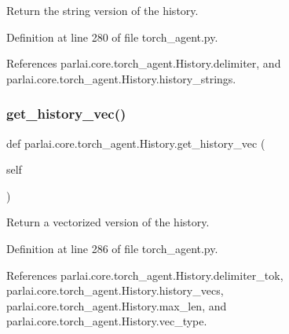 \begin{DoxyVerb}Return the string version of the history.\end{DoxyVerb}
 

Definition at line 280 of file torch\+\_\+agent.\+py.



References parlai.\+core.\+torch\+\_\+agent.\+History.\+delimiter, and parlai.\+core.\+torch\+\_\+agent.\+History.\+history\+\_\+strings.

\mbox{\label{classparlai_1_1core_1_1torch__agent_1_1History_a0d9c7a847af118f77e9986279acf7dea}} 
\subsubsection{\texorpdfstring{get\+\_\+history\+\_\+vec()}{get\_history\_vec()}}
{\footnotesize\ttfamily def parlai.\+core.\+torch\+\_\+agent.\+History.\+get\+\_\+history\+\_\+vec (\begin{DoxyParamCaption}\item[{}]{self }\end{DoxyParamCaption})}

\begin{DoxyVerb}Return a vectorized version of the history.\end{DoxyVerb}
 

Definition at line 286 of file torch\+\_\+agent.\+py.



References parlai.\+core.\+torch\+\_\+agent.\+History.\+delimiter\+\_\+tok, parlai.\+core.\+torch\+\_\+agent.\+History.\+history\+\_\+vecs, parlai.\+core.\+torch\+\_\+agent.\+History.\+max\+\_\+len, and parlai.\+core.\+torch\+\_\+agent.\+History.\+vec\+\_\+type.

\mbox{\label{classparlai_1_1core_1_1torch__agent_1_1History_a117862fe92da69172cb8e0c494bcd280}} 

